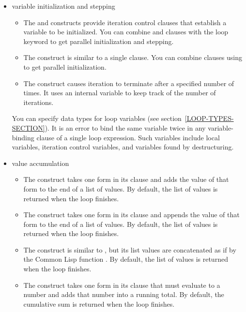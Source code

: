 \begin{new}
\begin{itemize}
  \item 
  variable initialization and stepping

  \begin{itemize}
  \item
  The  and  constructs provide iteration control clauses
  that establish a variable to be initialized.
  You can combine  and  clauses with the loop
  keyword  to get parallel initialization and stepping.

  \item
  The  construct is similar to a single  clause.
  You can combine  clauses using
   to get parallel initialization.

  \item
  The  construct causes iteration to terminate after a specified
   number of times.  It uses an internal variable to keep track of the
   number of iterations.
  \end{itemize}

  You can specify data types for loop variables (see
  section~\ref{LOOP-TYPES-SECTION}).
  It is an error to bind the same variable twice in any variable-binding
  clause of a single loop expression.  Such variables include
  local variables, iteration control variables, and variables found by
  destructuring.


  \item value accumulation

  \begin{itemize}
  \item The  construct takes one form in its clause
  and adds the value of that form to the end of a list of values.  By
  default, the list of values is returned when the loop finishes.

  \item
  The  construct  takes one form in its clause
  and appends the value of that form to the end of a list of values.  By
  default, the list of values is returned when the loop finishes.

  \item The  construct is similar to , but
  its list values are concatenated as if by the Common Lisp function
  .  By
  default, the list of values is returned when the loop finishes.

  \item The  construct takes one form in its clause that
  must evaluate to a number and adds that number into a running total.
  By default, the cumulative sum is returned when the loop finishes.


\end{itemize}
\end{itemize}
\end{new}
